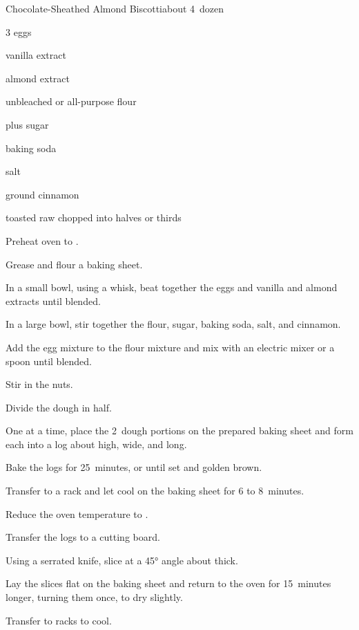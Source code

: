 \begin{recipe}{Chocolate-Sheathed Almond Biscotti}{}{about 4\half\ dozen}

\begin{ingredients}
\item 3 eggs
\item {} vanilla extract
\item \tp{\quarter} almond extract
\item \C{2\quarter} unbleached or all-purpose flour
\item \C{\threequarter} plus  sugar
\item {} baking soda
\item \tp{\half} salt
\item {} ground cinnamon
\item \C{\threequarter} toasted raw  chopped into halves or thirds
\end{ingredients}

\begin{directions}
\item Preheat oven to .
\item Grease and flour a baking sheet.
\item In a small bowl, using a whisk, beat together the eggs and vanilla and almond extracts until blended.
\item In a large bowl, stir together the flour, sugar, baking soda, salt, and cinnamon.
\item Add the egg mixture to the flour mixture and mix with an electric mixer or a spoon until blended.
\item Stir in the nuts.
\item Divide the dough in half.
\item One at a time, place the 2~dough portions on the prepared baking sheet and form each into a log about \inch{\half} high, \inch{1 \half} wide, and  long.
\item Bake the logs for 25~minutes, or until set and golden brown.
\item Transfer to a rack and let cool on the baking sheet for 6 to 8~minutes.
\item Reduce the oven temperature to .
\item Transfer the logs to a cutting board.
\item Using a serrated knife, slice at a \ang{45} angle about \cm{\half} thick.
\item Lay the slices flat on the baking sheet and return to the oven for 15~minutes longer, turning them once, to dry slightly.
\item Transfer to racks to cool.
\end{directions}


\end{recipe}
